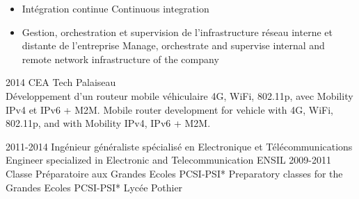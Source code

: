 \documentclass[print]{cv-style}
\begin{document}
\begin{entrylist}
{\begin{itemize}
    {Contribution opensource: DPDK, Kernel}
    {Opensource contribution: DPDK, Kernel}
    \item \translate
    {Intégration continue}
    {Continuous integration}
    \item \translate
    {Gestion, orchestration et supervision de l'infrastructure réseau interne et distante de l'entreprise}
    {Manage, orchestrate and supervise internal and remote network infrastructure of the company}
  \end{itemize}}
\entry
  {2014}
  {CEA Tech}
  {Palaiseau}
  {\\
  \translate
  {Développement d'un routeur mobile véhiculaire 4G, WiFi, 802.11p, avec Mobility IPv4 et IPv6 + M2M.}
  {Mobile router development for vehicle with 4G, WiFi, 802.11p, and with Mobility IPv4, IPv6 + M2M.}
   \\}
\end{entrylist}


\begin{entrylist}
\entry
{2011-2014}
{\translate
   {Ingénieur généraliste {\normalfont spécialisé en Electronique et Télécommunications}}
   {Engineer {\normalfont specialized in Electronic and Telecommunication}}
}
{ENSIL}
{}
\entry
{2009-2011}
{\translate
   {Classe Préparatoire aux Grandes Ecoles {\normalfont PCSI-PSI*}}
   {Preparatory classes for the Grandes Ecoles {\normalfont PCSI-PSI*}}
}
{Lycée Pothier}

\end{entrylist}

\end{document}
